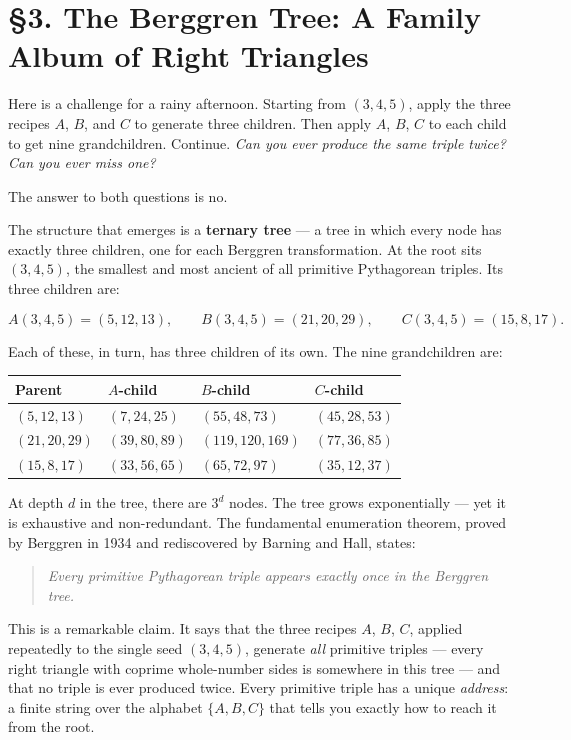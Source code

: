 \section{§3. The Berggren Tree: A Family Album of Right Triangles}\label{ch16-the-berggren-tree-a-family-album-of-right-triangles}

Here is a challenge for a rainy afternoon. Starting from \((3, 4, 5)\), apply the three recipes \(A\), \(B\), and \(C\) to generate three children. Then apply \(A\), \(B\), \(C\) to each child to get nine grandchildren. Continue. \emph{Can you ever produce the same triple twice? Can you ever miss one?}

The answer to both questions is no.

The structure that emerges is a \textbf{ternary tree} --- a tree in which every node has exactly three children, one for each Berggren transformation. At the root sits \((3, 4, 5)\), the smallest and most ancient of all primitive Pythagorean triples. Its three children are:

\[A(3,4,5) = (5, 12, 13), \qquad B(3,4,5) = (21, 20, 29), \qquad C(3,4,5) = (15, 8, 17).\]

Each of these, in turn, has three children of its own. The nine grandchildren are:

\begin{longtable}[]{@{}llll@{}}
\toprule\noalign{}
Parent & \(A\)-child & \(B\)-child & \(C\)-child \\
\midrule\noalign{}
\endhead
\bottomrule\noalign{}
\endlastfoot
\((5, 12, 13)\) & \((7, 24, 25)\) & \((55, 48, 73)\) & \((45, 28, 53)\) \\
\((21, 20, 29)\) & \((39, 80, 89)\) & \((119, 120, 169)\) & \((77, 36, 85)\) \\
\((15, 8, 17)\) & \((33, 56, 65)\) & \((65, 72, 97)\) & \((35, 12, 37)\) \\
\end{longtable}

At depth \(d\) in the tree, there are \(3^d\) nodes. The tree grows exponentially --- yet it is exhaustive and non-redundant. The fundamental enumeration theorem, proved by Berggren in 1934 and rediscovered by Barning and Hall, states:

\begin{quote}
\emph{Every primitive Pythagorean triple appears exactly once in the Berggren tree.}
\end{quote}

This is a remarkable claim. It says that the three recipes \(A\), \(B\), \(C\), applied repeatedly to the single seed \((3, 4, 5)\), generate \emph{all} primitive triples --- every right triangle with coprime whole-number sides is somewhere in this tree --- and that no triple is ever produced twice. Every primitive triple has a unique \emph{address}: a finite string over the alphabet \(\{A, B, C\}\) that tells you exactly how to reach it from the root.

